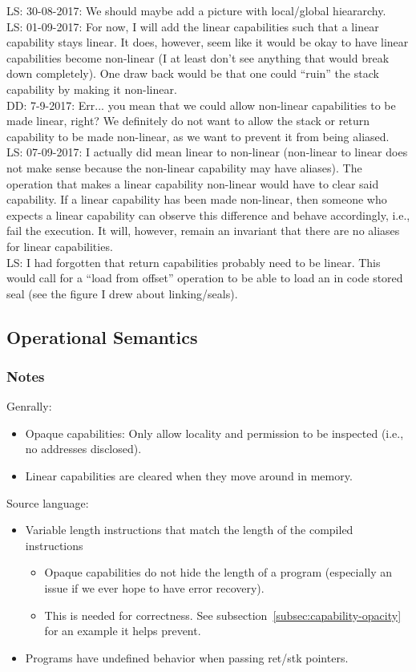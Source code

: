 \documentclass[a4paper]{article}
\newcommand\lau[1]{{\color{purple} \sf \footnotesize {LS: #1}}\\}
\newcommand\dominique[1]{{\color{purple} \sf \footnotesize {DD: #1}}\\}
\begin{document}
\lau{30-08-2017: We should maybe add a picture with local/global hieararchy.}
\lau{01-09-2017: For now, I will add the linear capabilities such that a linear capability stays linear. It does, however, seem like it would be okay to have linear capabilities become non-linear (I at least don't see anything that would break down completely). One draw back would be that one could ``ruin'' the stack capability by making it non-linear.}
\dominique{7-9-2017: Err... you mean that we could allow non-linear capabilities to be made linear, right?  We definitely do not want to allow the stack or return capability to be made non-linear, as we want to prevent it from being aliased.}
\lau{07-09-2017: I actually did mean linear to non-linear (non-linear to linear does not make sense because the non-linear capability may have aliases). The operation that makes a linear capability non-linear would have to clear said capability. If a linear capability has been made non-linear, then someone who expects a linear capability can observe this difference and behave accordingly, i.e., fail the execution. It will, however, remain an invariant that there are no aliases for linear capabilities.}
\lau{I had forgotten that return capabilities probably need to be linear. This would call for a ``load from offset'' operation to be able to load an in code stored seal (see the figure I drew about linking/seals).}

\subsection{Operational Semantics}
\subsubsection{Notes}
Genrally:
\begin{itemize}
\item Opaque capabilities: Only allow locality and permission to be inspected (i.e., no addresses disclosed).
\item Linear capabilities are cleared when they move around in memory.
\end{itemize}

Source language:
\begin{itemize}
\item Variable length instructions that match the length of the compiled instructions
  \begin{itemize}
  \item Opaque capabilities do not hide the length of a program (especially an issue if we ever hope to have error recovery).
  \item This is needed for correctness. See subsection~\ref{subsec:capability-opacity} for an example it helps prevent.
  \end{itemize}
\item Programs have undefined behavior when passing ret/stk pointers.
\end{itemize}
\end{document}
